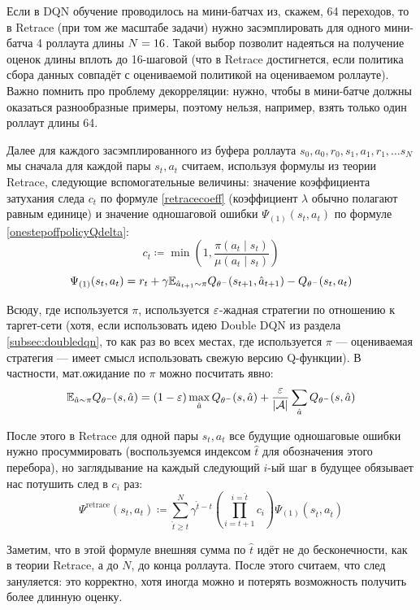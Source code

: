 \begin{remark}
Если в DQN обучение проводилось на мини-батчах из, скажем, 64 переходов, то в Retrace (при том же масштабе задачи) нужно засэмплировать для одного мини-батча 4 роллаута длины $N\HM=16$. Такой выбор позволит надеяться на получение оценок длины вплоть до 16-шаговой (что в Retrace достигнется, если политика сбора данных совпадёт с оцениваемой политикой на оцениваемом роллауте). Важно помнить про проблему декорреляции: нужно, чтобы в мини-батче должны оказаться разнообразные примеры, поэтому нельзя, например, взять только один роллаут длины 64.  
\end{remark}

Далее для каждого засэмплированного из буфера роллаута $s_0, a_0, r_0, s_1, a_1, r_1, \dots s_N$ мы сначала для каждой пары $s_t, a_t$ считаем, используя формулы из теории Retrace, следующие вспомогательные величины: значение коэффициента затухания следа $c_t$ по формуле \eqref{retracecoeff} (коэффициент $\lambda$ обычно полагают равным единице) и значение одношаговой ошибки $\Psi_{(1)}(s_t, a_t)$ по формуле \eqref{onestepoffpolicyQdelta}:
$$c_t \coloneqq \min \left( 1, \frac{\pi(a_t \mid s_t) }{\mu(a_t \mid s_t)} \right) $$
$$\Psi_{(1)}(s_t, a_t) = r_t + \gamma \mathbb{E}_{\hat{a}_{t+1} \sim \pi} Q_{\theta^{-}}(s_{t+1}, \hat{a}_{t+1}) - Q_{\theta^{-}}(s_t, a_t)$$

Всюду, где используется $\pi$, используется $\varepsilon$-жадная стратегии по отношению к таргет-сети (хотя, если использовать идею Double DQN из раздела \ref{subsec:doubledqn}, то как раз во всех местах, где используется $\pi$ --- оцениваемая стратегия --- имеет смысл использовать свежую версию Q-функции). В частности, мат.ожидание по $\pi$ можно посчитать явно:
$$\mathbb{E}_{\hat{a} \sim \pi} Q_{\theta^{-}}(s, \hat{a}) = (1 - \varepsilon) \max_{\hat{a}} Q_{\theta^{-}}(s, \hat{a}) + \frac{\varepsilon}{|\mathcal{A}|} \sum_{\hat{a}} Q_{\theta^{-}}(s, \hat{a}) $$

После этого в Retrace для одной пары $s_t, a_t$ все будущие одношаговые ошибки нужно просуммировать (воспользуемся индексом $\hat{t}$ для обозначения этого перебора), но заглядывание на каждый следующий $i$-ый шаг в будущее обязывает нас потушить след в $c_i$ раз: 
$$\Psi^{\mathrm{retrace}}(s_t, a_t) \coloneqq \sum_{\hat{t} \ge t}^N \gamma^{\hat{t} - t}  \left( \prod_{i = t+1}^{i = \hat{t}} c_{i} \right) \Psi_{(1)}(s_{\hat{t}}, a_{\hat{t}})$$

Заметим, что в этой формуле внешняя сумма по $\hat{t}$ идёт не до бесконечности, как в теории Retrace, а до $N$, до конца роллаута. После этого считаем, что след зануляется: это корректно, хотя иногда можно и потерять возможность получить более длинную оценку.


